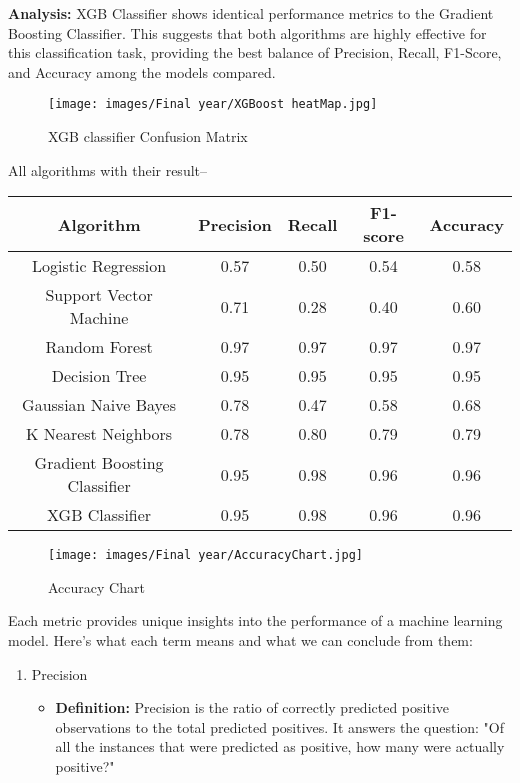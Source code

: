 \documentclass{report}
\begin{document}
{\textbf{Analysis: } XGB Classifier shows identical performance metrics to the Gradient Boosting Classifier. This suggests that both algorithms are highly effective for this classification task, providing the best balance of Precision, Recall, F1-Score, and Accuracy among the models compared.

\vspace{1cm}
    \begin{figure}[h!]
    \centering
        \texttt{[image: images/Final year/XGBoost heatMap.jpg]} %
        \caption{XGB classifier Confusion Matrix}
    \end{figure}
\newpage All algorithms with their result--
\begin{center}
\begin{tabular}{|c|c|c|c|c|}
  \hline
   Algorithm & Precision & Recall & F1-score & Accuracy \\
  \hline
  Logistic Regression & 0.57 & 0.50 & 0.54 & 0.58 \\
  Support Vector Machine & 0.71 & 0.28 & 0.40 & 0.60 \\
  Random Forest & 0.97 & 0.97 & 0.97  & 0.97 \\
  Decision Tree & 0.95 & 0.95 & 0.95  & 0.95 \\
  Gaussian Naive Bayes & 0.78 & 0.47 & 0.58 & 0.68 \\
  K Nearest Neighbors & 0.78 & 0.80 & 0.79  & 0.79 \\
  Gradient Boosting Classifier & 0.95 & 0.98 & 0.96  & 0.96 \\
  XGB Classifier & 0.95 & 0.98 & 0.96  & 0.96 \\
  \hline
\end{tabular}
\end{center}

    \begin{figure}[h!]
    \centering
        \texttt{[image: images/Final year/AccuracyChart.jpg]} 
        \caption{Accuracy Chart}
    \end{figure}

\newpage Each metric provides unique insights into the performance of a machine learning model. Here's what each term means and what we can conclude from them:

\begin{enumerate}
    \item Precision
    \begin{itemize}
        \item \textbf{Definition:} Precision is the ratio of correctly predicted positive observations to the total predicted positives. It answers the question: "Of all the instances that were predicted as positive, how many were actually positive?"
        

\end{itemize}
\end{enumerate}}
\end{document}
